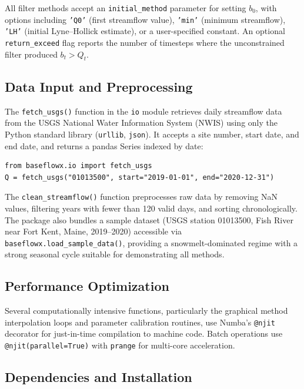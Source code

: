 \documentclass[hydrology,article,submit,pdftex,moreauthors]{Definitions/mdpi}
\begin{document}
All filter methods accept an \texttt{initial\_method} parameter for setting $b_0$, with options including \texttt{'Q0'} (first streamflow value), \texttt{'min'} (minimum streamflow), \texttt{'LH'} (initial Lyne--Hollick estimate), or a user-specified constant. An optional \texttt{return\_exceed} flag reports the number of timesteps where the unconstrained filter produced $b_t > Q_t$.

\subsection{Data Input and Preprocessing}
\label{sec:data_input}

The \texttt{fetch\_usgs()} function in the \texttt{io} module retrieves daily streamflow data from the USGS National Water Information System (NWIS) using only the Python standard library (\texttt{urllib}, \texttt{json}). It accepts a site number, start date, and end date, and returns a pandas Series indexed by date:

\begin{lstlisting}
from baseflowx.io import fetch_usgs
Q = fetch_usgs("01013500", start="2019-01-01", end="2020-12-31")
\end{lstlisting}

The \texttt{clean\_streamflow()} function preprocesses raw data by removing NaN values, filtering years with fewer than 120 valid days, and sorting chronologically. The package also bundles a sample dataset (USGS station 01013500, Fish River near Fort Kent, Maine, 2019--2020) accessible via \texttt{baseflowx.load\_sample\_data()}, providing a snowmelt-dominated regime with a strong seasonal cycle suitable for demonstrating all methods.

\subsection{Performance Optimization}
\label{sec:performance}

Several computationally intensive functions, particularly the graphical method interpolation loops and parameter calibration routines, use Numba's \texttt{@njit} decorator for just-in-time compilation to machine code. Batch operations use \texttt{@njit(parallel=True)} with \texttt{prange} for multi-core acceleration.

\subsection{Dependencies and Installation}
\label{sec:dependencies}
\end{document}
